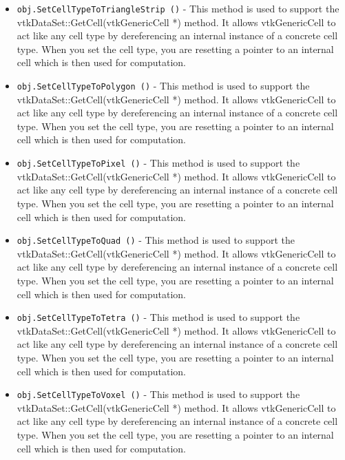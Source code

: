 \begin{itemize}
\item  \verb|obj.SetCellTypeToTriangleStrip ()| -  This method is used to support the vtkDataSet::GetCell(vtkGenericCell *)
 method. It allows vtkGenericCell to act like any cell type by
 dereferencing an internal instance of a concrete cell type. When
 you set the cell type, you are resetting a pointer to an internal
 cell which is then used for computation.

\item  \verb|obj.SetCellTypeToPolygon ()| -  This method is used to support the vtkDataSet::GetCell(vtkGenericCell *)
 method. It allows vtkGenericCell to act like any cell type by
 dereferencing an internal instance of a concrete cell type. When
 you set the cell type, you are resetting a pointer to an internal
 cell which is then used for computation.

\item  \verb|obj.SetCellTypeToPixel ()| -  This method is used to support the vtkDataSet::GetCell(vtkGenericCell *)
 method. It allows vtkGenericCell to act like any cell type by
 dereferencing an internal instance of a concrete cell type. When
 you set the cell type, you are resetting a pointer to an internal
 cell which is then used for computation.

\item  \verb|obj.SetCellTypeToQuad ()| -  This method is used to support the vtkDataSet::GetCell(vtkGenericCell *)
 method. It allows vtkGenericCell to act like any cell type by
 dereferencing an internal instance of a concrete cell type. When
 you set the cell type, you are resetting a pointer to an internal
 cell which is then used for computation.

\item  \verb|obj.SetCellTypeToTetra ()| -  This method is used to support the vtkDataSet::GetCell(vtkGenericCell *)
 method. It allows vtkGenericCell to act like any cell type by
 dereferencing an internal instance of a concrete cell type. When
 you set the cell type, you are resetting a pointer to an internal
 cell which is then used for computation.

\item  \verb|obj.SetCellTypeToVoxel ()| -  This method is used to support the vtkDataSet::GetCell(vtkGenericCell *)
 method. It allows vtkGenericCell to act like any cell type by
 dereferencing an internal instance of a concrete cell type. When
 you set the cell type, you are resetting a pointer to an internal
 cell which is then used for computation.


\end{itemize}
